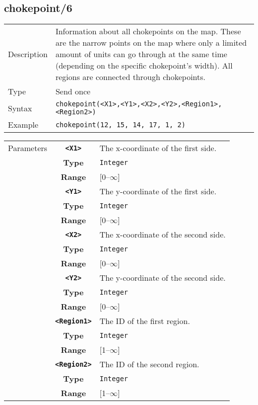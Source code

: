 \subsection{chokepoint/6}
\begin{tabularx}{\textwidth}{lX}
 Description & Information about all chokepoints on the map. These are the narrow points on the map where only a limited amount of units can go through at the same time (depending on the specific chokepoint's width). All regions are connected through chokepoints. \\
 Type & Send once \\
 Syntax & \verb|chokepoint(<X1>,<Y1>,<X2>,<Y2>,<Region1>,<Region2>)| \\
 Example & \verb|chokepoint(12, 15, 14, 17, 1, 2)| \\
 \end{tabularx}
 \begin{tabularx}{\textwidth}{l | c | p{8cm}|}
 \cline{2-3}
 Parameters & \textbf{\verb|<X1>|} & The x-coordinate of the first side.\\
            & \textbf{Type} & \verb|Integer| \\
            & \textbf{Range} & [0--$\infty$] \\
            \cline{2-3}
            & \textbf{\verb|<Y1>|} & The y-coordinate of the first side.\\
            & \textbf{Type} & \verb|Integer| \\
            & \textbf{Range} & [0--$\infty$] \\
            \cline{2-3}
            & \textbf{\verb|<X2>|} & The x-coordinate of the second side.\\
            & \textbf{Type} & \verb|Integer| \\
            & \textbf{Range} & [0--$\infty$] \\
            \cline{2-3}
            & \textbf{\verb|<Y2>|} & The y-coordinate of the second side.\\
            & \textbf{Type} & \verb|Integer| \\
            & \textbf{Range} & [0--$\infty$] \\
            \cline{2-3}
            & \textbf{\verb|<Region1>|} & The ID of the first region.\\
            & \textbf{Type} & \verb|Integer| \\
            & \textbf{Range} & [1--$\infty$] \\
            \cline{2-3}
            & \textbf{\verb|<Region2>|} & The ID of the second region.\\
            & \textbf{Type} & \verb|Integer| \\
            & \textbf{Range} & [1--$\infty$] \\
            \cline{2-3}
\end{tabularx}

